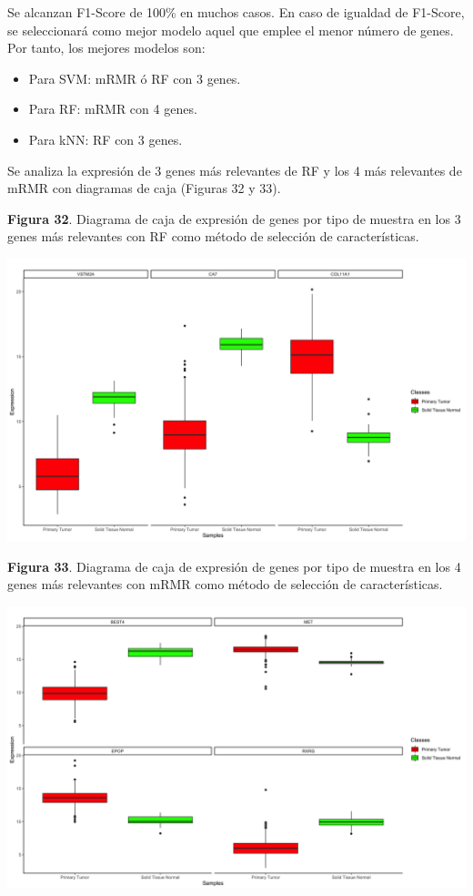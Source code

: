 Se alcanzan F1-Score de 100\% en muchos casos. En caso de igualdad de F1-Score, se seleccionará como mejor modelo aquel que emplee el menor número de genes. Por tanto, los mejores modelos son:
\begin{itemize}
	\item Para SVM: mRMR ó RF con 3 genes.
	\item Para RF: mRMR con 4 genes.
	\item Para kNN: RF con 3 genes.
\end{itemize}

Se analiza la expresión de 3 genes más relevantes de RF y los 4 más relevantes de mRMR con diagramas de caja (Figuras 32 y 33).

\newpage
\textbf{Figura 32}. Diagrama de caja de expresión de genes por tipo de muestra en los 3 genes más relevantes con RF como método de selección de características.
\begin{center}
	\includegraphics[width=1\textwidth]{figuras/32_cr_biclase_43_knn_boxplots_mejor_metodo.png} 
\end{center}

\textbf{Figura 33}. Diagrama de caja de expresión de genes por tipo de muestra en los 4 genes más relevantes con mRMR como método de selección de características.
\begin{center}
	\includegraphics[width=1\textwidth]{figuras/33_cr_biclase_30_rf_boxplots_mejor_metodo.png} 
\end{center}

